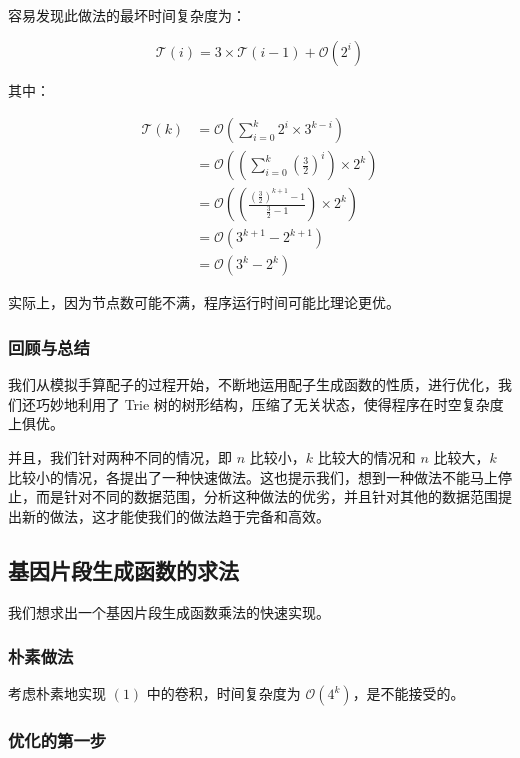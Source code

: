\documentclass{article}
\begin{document}
\newpage

容易发现此做法的最坏时间复杂度为：

$$\mathcal T(i)=3 \times \mathcal T(i-1) + \mathcal O(2^i)$$

其中：

$$
\begin{aligned}
    \mathcal T(k) &= \mathcal O\left(\sum_{i=0}^k 2^i \times 3^{k-i} \right) \\
                  &= \mathcal O\left( \left (\sum_{i=0}^k (\frac{3}{2})^i \right) \times 2^k \right) \\
                  &= \mathcal O\left( \left(\frac{\left(\frac{3}{2}\right)^{k+1}-1}{\frac{3}{2}-1}\right) \times 2^k\right) \\
                  &= \mathcal O(3^{k+1} - 2^{k+1}) \\
                  &= \mathcal O(3^k-2^k)
\end{aligned}
$$

实际上，因为节点数可能不满，程序运行时间可能比理论更优。

\subsubsection*{回顾与总结}

我们从模拟手算配子的过程开始，不断地运用配子生成函数的性质，进行优化，我们还巧妙地利用了 Trie 树的树形结构，压缩了无关状态，使得程序在时空复杂度上俱优。

并且，我们针对两种不同的情况，即 $n$ 比较小，$k$ 比较大的情况和 $n$ 比较大，$k$ 比较小的情况，各提出了一种快速做法。这也提示我们，想到一种做法不能马上停止，而是针对不同的数据范围，分析这种做法的优劣，并且针对其他的数据范围提出新的做法，这才能使我们的做法趋于完备和高效。

\newpage

\subsection{基因片段生成函数的求法}

我们想求出一个基因片段生成函数乘法的快速实现。

\subsubsection*{朴素做法}

考虑朴素地实现 $(1)$ 中的卷积，时间复杂度为 $\mathcal O(4^k)$，是不能接受的。

\subsubsection*{优化的第一步}
\end{document}
